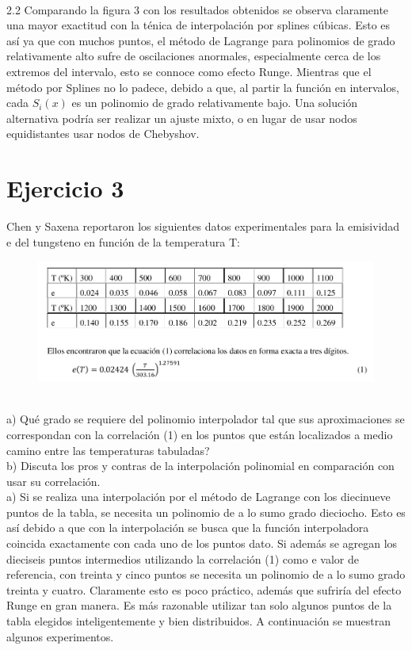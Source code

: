 \documentclass{article}
\begin{document}
\\
2.2
Comparando la figura 3 con los resultados obtenidos se observa claramente una mayor exactitud con la ténica de interpolación por splines cúbicas. Esto es así ya que con muchos puntos, el método de Lagrange para polinomios de grado relativamente alto sufre de oscilaciones anormales, especialmente cerca de los extremos del intervalo, esto se connoce como efecto Runge. Mientras que el método por Splines no lo padece, debido a que, al partir la función en intervalos, cada $S_i(x)$ es un polinomio de grado relativamente bajo. Una solución alternativa podría ser realizar un ajuste mixto, o en lugar de usar nodos equidistantes usar nodos de Chebyshov. \\
\vspace{3cm}
\section{Ejercicio 3}
Chen y Saxena reportaron los siguientes datos experimentales para la emisividad e del
tungsteno en función de la temperatura T:\\
\begin{figure}[H]
    \centering
    \includegraphics[width=1\linewidth]{ej3.png}
    \label{fig:enter-label}
\end{figure}\\

a) Qué grado se requiere del polinomio interpolador tal que sus aproximaciones se correspondan con
la correlación (1) en los puntos que están localizados a medio camino entre las temperaturas
tabuladas? \\
b) Discuta los pros y contras de la interpolación polinomial en comparación con usar su correlación.\\

a) Si se realiza una interpolación por el método de Lagrange con los diecinueve puntos de la tabla, se necesita un polinomio de a lo sumo grado dieciocho. Esto es así debido a que con la interpolación se busca que la función interpoladora coincida exactamente con cada uno de los puntos dato. Si además se agregan los dieciseis puntos intermedios utilizando la correlación (1) como e valor de referencia, con treinta y cinco puntos se necesita un polinomio de a lo sumo grado treinta y cuatro. Claramente esto es poco práctico, además que sufriría del efecto Runge en gran manera. Es más razonable utilizar tan solo algunos puntos de la tabla elegidos inteligentemente y bien distribuidos. A continuación se muestran algunos experimentos.
\end{document}
